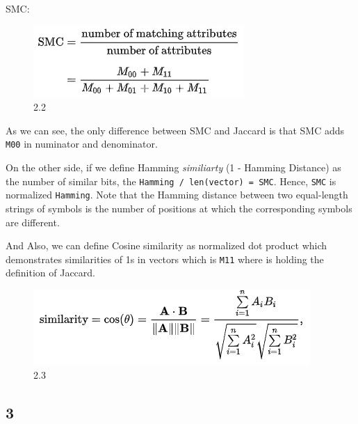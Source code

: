 \documentclass[11pt]{article}
\makeatletter
\def\maxwidth{\ifdim\Gin@nat@width>\linewidth\linewidth
    \else\Gin@nat@width\fi}
\let\Oldincludegraphics\includegraphics
\renewcommand{\includegraphics}[1]{\Oldincludegraphics[width=.8\maxwidth]{#1}}
\makeatother
\begin{document}
SMC:

\begin{figure}
\centering
\includegraphics{wiki/2.2.jpg}
\caption{2.2}
\end{figure}

As we can see, the only difference between SMC and Jaccard is that SMC
adds \texttt{M00} in numinator and denominator.

On the other side, if we define Hamming \emph{similiarty} (1 - Hamming
Distance) as the number of similar bits, the
\texttt{Hamming\ /\ len(vector)\ =\ SMC}. Hence, \texttt{SMC} is
normalized \texttt{Hamming}. Note that the Hamming distance between two
equal-length strings of symbols is the number of positions at which the
corresponding symbols are different.

And Also, we can define Cosine similarity as normalized dot product
which demonstrates similarities of 1s in vectors which is \texttt{M11}
where is holding the definition of Jaccard.

\begin{figure}
\centering
\includegraphics{wiki/2.3.jpg}
\caption{2.3}
\end{figure}

    \hypertarget{section}{%
\subsection{3}\label{section}}
\end{document}
